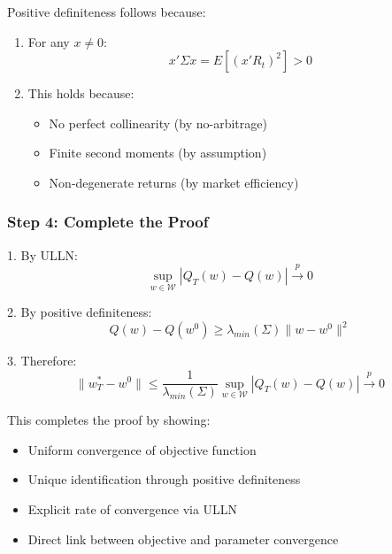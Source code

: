 \documentclass[12pt,article]{memoir}
\begin{document}
Positive definiteness follows because:
\begin{enumerate}
    \item For any $x \neq 0$:
    \begin{equation}
        x'\Sigma x = E[(x'R_t)^2] > 0
    \end{equation}

    \item This holds because:
    \begin{itemize}
        \item No perfect collinearity (by no-arbitrage)
        \item Finite second moments (by assumption)
        \item Non-degenerate returns (by market efficiency)
    \end{itemize}
\end{enumerate}

\subsubsection{Step 4: Complete the Proof}

1. By ULLN:
\begin{equation}
    \sup_{w \in \mathcal{W}} |Q_T(w) - Q(w)| \xrightarrow{p} 0
\end{equation}

2. By positive definiteness:
\begin{equation}
    Q(w) - Q(w^0) \geq \lambda_{min}(\Sigma)\|w - w^0\|^2
\end{equation}

3. Therefore:
\begin{equation}
    \|w_T^* - w^0\| \leq \frac{1}{\lambda_{min}(\Sigma)}\sup_{w \in \mathcal{W}} |Q_T(w) - Q(w)| \xrightarrow{p} 0
\end{equation}

This completes the proof by showing:
\begin{itemize}
    \item Uniform convergence of objective function
    \item Unique identification through positive definiteness
    \item Explicit rate of convergence via ULLN
    \item Direct link between objective and parameter convergence
\end{itemize}

\end{document}
